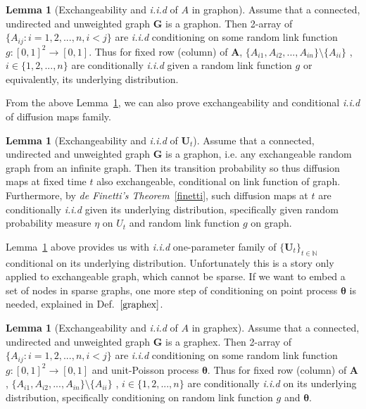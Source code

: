 \documentclass[12pt]{article}
\theoremstyle{definition}
\newtheorem{lemma}[theorem]{Lemma}
\begin{document}
\begin{lemma}[Exchangeability and \textit{i.i.d} of $A$ in graphon]
	\label{lemma_graphon}
Assume that a connected, undirected and unweighted graph $\mathbf{G}$ is a graphon. Then 2-array of $\{ A_{ij} : i = 1,2,... ,n , i < j \}$ are  \textit{i.i.d} conditioning on some random link function $g : [0,1]^2 \rightarrow [0,1]$. Thus for fixed row (column) of $\mathbf{A}$, $\{ A_{i1}, A_{i2}, ... , A_{in} \} \setminus \{ A_{ii} \} $ , $i \in \{ 1,2,... , n \}$ are conditionally \textit{i.i.d} given a random link function $g$ or equivalently, its underlying distribution.  
\end{lemma}
From the above Lemma~\ref{lemma_graphon}, we can also prove exchangeability and conditional \textit{i.i.d} of diffusion maps family. 
	
\begin{lemma}[Exchangeability and \textit{i.i.d} of $\mathbf{U}_{t}$]
\label{main_lemma}
	Assume that a connected, undirected and unweighted graph $\mathbf{G}$ is a graphon, i.e. any exchangeable random graph from an infinite graph. Then its transition probability so thus diffusion maps at fixed time $t$ also exchangeable, conditional on link function of graph. Furthermore, by \textit{de Finetti's Theorem}~\ref{finetti}, such diffusion maps at $t$ are conditionally \textit{i.i.d} given its underlying distribution, specifically given random probability measure $\eta$ on $U_{t}$ and random link function $g$ on graph.    
\end{lemma}
	
Lemma~\ref{main_lemma} above provides us with \textit{i.i.d} one-parameter family of $\{ \mathbf{U}_{t} \}_{t \in \mathbb{N}}$ conditional on its underlying distribution. Unfortunately this is a story only applied to exchangeable graph, which cannot be sparse. If we want to embed a set of nodes in sparse graphs, one more step of conditioning on point process $\mathbf{\theta}$ is needed, explained in Def.~$\ref{graphex}$.  
	
\begin{lemma}[Exchangeability and \textit{i.i.d} of $A$ in graphex]
\label{lemma_graphex}
Assume that a connected, undirected and unweighted graph $\mathbf{G}$ is a graphex. Then 2-array of $\{ A_{ij} : i = 1,2,... ,n , i < j \}$ are  \textit{i.i.d} conditioning on some random link function $g : [0,1]^2 \rightarrow [0,1]$ and unit-Poisson process $\mathbf{\theta}$. Thus for fixed row (column) of $\mathbf{A}$, $\{ A_{i1}, A_{i2}, ... , A_{in} \} \setminus \{ A_{ii} \} $ , $i \in \{ 1,2,... , n \}$ are conditionally \textit{i.i.d} on its underlying distribution, specifically conditioning on random link function $g$ and $\mathbf{\theta}$.  
\end{lemma}	
\end{document}
